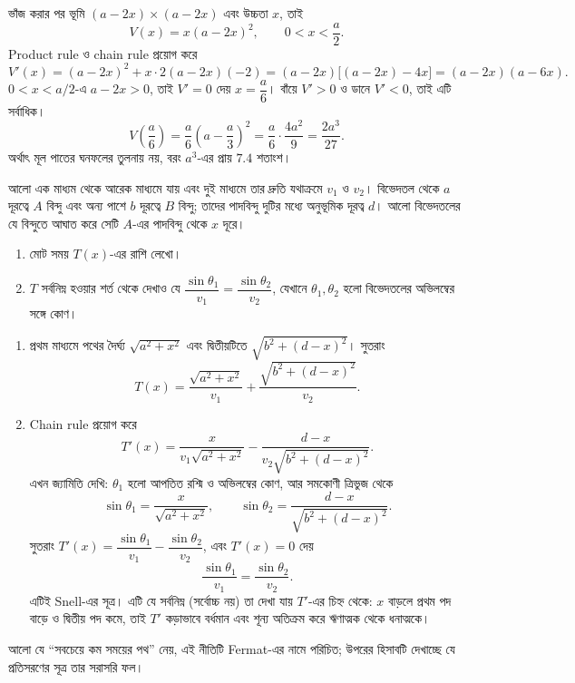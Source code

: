 \documentclass[11pt]{article}
\begin{document}
\begin{sol}
ভাঁজ করার পর ভূমি $(a-2x) \times (a-2x)$ এবং উচ্চতা $x$, তাই
\[
  V(x) = x(a-2x)^{2}, \qquad 0 < x < \frac{a}{2} .
\]
Product rule ও chain rule প্রয়োগ করে
\[
  V'(x) = (a-2x)^{2} + x \cdot 2(a-2x)(-2)
        = (a-2x)\bigl[ (a-2x) - 4x \bigr]
        = (a-2x)(a-6x) .
\]
$0 < x < a/2$-এ $a-2x > 0$, তাই $V' = 0$ দেয় $x = \dfrac{a}{6}$। বাঁয়ে
$V' > 0$ ও ডানে $V' < 0$, তাই এটি সর্বাধিক।
\[
  V\left( \frac{a}{6} \right)
  = \frac{a}{6}\left( a - \frac{a}{3} \right)^{2}
  = \frac{a}{6} \cdot \frac{4a^{2}}{9} = \frac{2a^{3}}{27} .
\]
অর্থাৎ মূল পাতের ঘনফলের তুলনায় নয়, বরং $a^{3}$-এর প্রায় $7.4$ শতাংশ।
\end{sol}

 আলো এক মাধ্যম থেকে আরেক মাধ্যমে যায় এবং দুই মাধ্যমে তার দ্রুতি
যথাক্রমে $v_{1}$ ও $v_{2}$। বিভেদতল থেকে $a$ দূরত্বে $A$ বিন্দু এবং অন্য পাশে
$b$ দূরত্বে $B$ বিন্দু; তাদের পাদবিন্দু দুটির মধ্যে অনুভূমিক দূরত্ব $d$। আলো
বিভেদতলের যে বিন্দুতে আঘাত করে সেটি $A$-এর পাদবিন্দু থেকে $x$ দূরে।
\begin{enumerate}
  \item মোট সময় $T(x)$-এর রাশি লেখো।
  \item $T$ সর্বনিম্ন হওয়ার শর্ত থেকে দেখাও যে
        $\dfrac{\sin\theta_{1}}{v_{1}} = \dfrac{\sin\theta_{2}}{v_{2}}$,
        যেখানে $\theta_{1}, \theta_{2}$ হলো বিভেদতলের অভিলম্বের সঙ্গে কোণ।
\end{enumerate}

\begin{sol}
\begin{enumerate}
  \item প্রথম মাধ্যমে পথের দৈর্ঘ্য $\sqrt{a^{2}+x^{2}}$ এবং দ্বিতীয়টিতে
        $\sqrt{b^{2}+(d-x)^{2}}$। সুতরাং
        \[
          T(x) = \frac{\sqrt{a^{2}+x^{2}}}{v_{1}}
               + \frac{\sqrt{b^{2}+(d-x)^{2}}}{v_{2}} .
        \]
  \item Chain rule প্রয়োগ করে
        \[
          T'(x) = \frac{x}{v_{1}\sqrt{a^{2}+x^{2}}}
                - \frac{d-x}{v_{2}\sqrt{b^{2}+(d-x)^{2}}} .
        \]
        এখন জ্যামিতি দেখি: $\theta_{1}$ হলো আপতিত রশ্মি ও অভিলম্বের কোণ, আর
        সমকোণী ত্রিভুজ থেকে
        \[
          \sin\theta_{1} = \frac{x}{\sqrt{a^{2}+x^{2}}}, \qquad
          \sin\theta_{2} = \frac{d-x}{\sqrt{b^{2}+(d-x)^{2}}} .
        \]
        সুতরাং $T'(x) = \dfrac{\sin\theta_{1}}{v_{1}} -
        \dfrac{\sin\theta_{2}}{v_{2}}$, এবং $T'(x) = 0$ দেয়
        \[
          \frac{\sin\theta_{1}}{v_{1}} = \frac{\sin\theta_{2}}{v_{2}} .
        \]
        এটিই Snell-এর সূত্র। এটি যে সর্বনিম্ন (সর্বোচ্চ নয়) তা দেখা যায়
        $T'$-এর চিহ্ন থেকে: $x$ বাড়লে প্রথম পদ বাড়ে ও দ্বিতীয় পদ কমে, তাই
        $T'$ কড়াভাবে বর্ধমান এবং শূন্য অতিক্রম করে ঋণাত্মক থেকে ধনাত্মকে।
\end{enumerate}
আলো যে ``সবচেয়ে কম সময়ের পথ'' নেয়, এই নীতিটি Fermat-এর নামে পরিচিত; উপরের
হিসাবটি দেখাচ্ছে যে প্রতিসরণের সূত্র তার সরাসরি ফল।
\end{sol}
\end{document}
